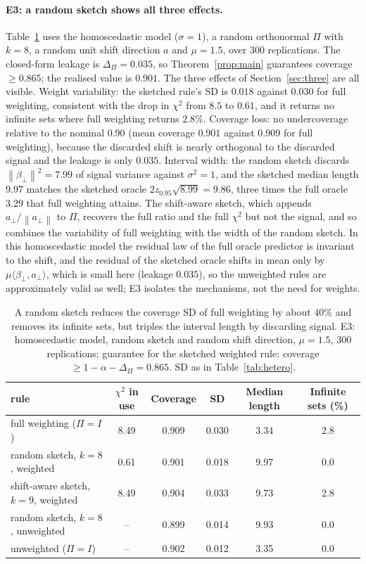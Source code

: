\documentclass[11pt,a4paper]{article}
\newcommand{\norm}[1]{\left\|#1\right\|}
\theoremstyle{plain}
\theoremstyle{definition}
\theoremstyle{remark}
\begin{document}
\paragraph{E3: a random sketch shows all three effects.}
Table~\ref{tab:random} uses the homoscedastic model ($\sigma=1$), a random orthonormal $\Pi$ with $k=8$, a random unit shift direction $a$ and $\mu=1.5$, over $300$ replications. The closed-form leakage is $\Delta_\Pi=0.035$, so Theorem~\ref{prop:main} guarantees coverage $\ge0.865$; the realised value is $0.901$. The three effects of Section~\ref{sec:three} are all visible. Weight variability: the sketched rule's SD is $0.018$ against $0.030$ for full weighting, consistent with the drop in $\chi^2$ from $8.5$ to $0.61$, and it returns no infinite sets where full weighting returns $2.8\%$. Coverage loss: no undercoverage relative to the nominal $0.90$ (mean coverage $0.901$ against $0.909$ for full weighting), because the discarded shift is nearly orthogonal to the discarded signal and the leakage is only $0.035$. Interval width: the random sketch discards $\norm{\beta_\perp}^2=7.99$ of signal variance against $\sigma^2=1$, and the sketched median length $9.97$ matches the sketched oracle $2z_{0.95}\sqrt{8.99}=9.86$, three times the full oracle $3.29$ that full weighting attains. The shift-aware sketch, which appends $a_\perp/\norm{a_\perp}$ to $\Pi$, recovers the full ratio and the full $\chi^2$ but not the signal, and so combines the variability of full weighting with the width of the random sketch. In this homoscedastic model the residual law of the full oracle predictor is invariant to the shift, and the residual of the sketched oracle shifts in mean only by $\mu\langle\beta_\perp,a_\perp\rangle$, which is small here (leakage $0.035$), so the unweighted rules are approximately valid as well; E3 isolates the mechanisms, not the need for weights.

\begin{table}[!htbp]\centering\footnotesize\setlength{\tabcolsep}{5pt}
\begin{tabular}{lccccc}
\toprule
rule & $\chi^2$ in use & Coverage & SD & Median length & Infinite sets (\%)\\
\midrule
full weighting ($\Pi=I$) & 8.49 & 0.909 & 0.030 & 3.34 & 2.8\\
random sketch, $k=8$, weighted & 0.61 & 0.901 & 0.018 & 9.97 & 0.0\\
shift-aware sketch, $k=9$, weighted & 8.49 & 0.904 & 0.033 & 9.73 & 2.8\\
random sketch, $k=8$, unweighted & -- & 0.899 & 0.014 & 9.93 & 0.0\\
unweighted ($\Pi=I$) & -- & 0.902 & 0.012 & 3.35 & 0.0\\
\bottomrule
\end{tabular}
\caption{A random sketch reduces the coverage SD of full weighting by about $40\%$ and removes its infinite sets, but triples the interval length by discarding signal. E3: homoscedastic model, random sketch and random shift direction, $\mu=1.5$, $300$ replications; guarantee for the sketched weighted rule: coverage $\ge1-\alpha-\Delta_\Pi=0.865$. SD as in Table~\ref{tab:hetero}.}\label{tab:random}
\end{table}
\end{document}
